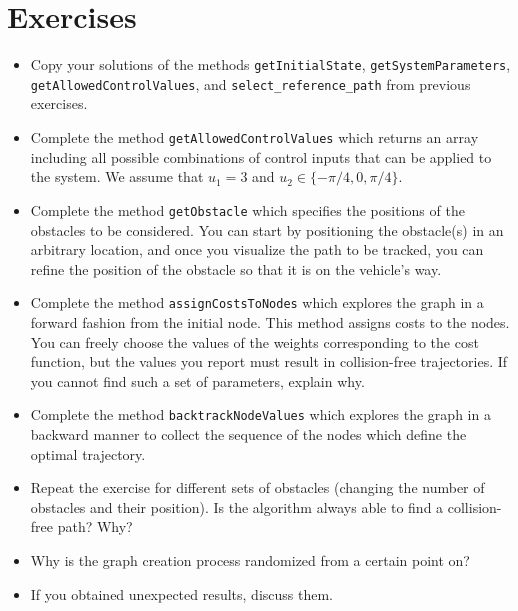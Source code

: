 \section{Exercises}
	\begin{itemize}
		\item Copy your solutions of the methods \texttt{getInitialState}, \texttt{getSystemParameters}, \newline \texttt{getAllowedControlValues}, and \texttt{select\_reference\_path} from previous exercises. 
		\item Complete the method \texttt{getAllowedControlValues} which returns an array including all possible combinations of control inputs that can be applied to the system. 
			We assume that $u_1 = 3$ and $u_2 \in \lbrace -\pi/4, 0, \pi/4 \rbrace$.
		\item Complete the method \texttt{getObstacle} which specifies the positions of the obstacles to be considered. You can start by positioning the obstacle(s) in an arbitrary location, and once you  visualize the path to be tracked, you can refine the position of the obstacle so that it is on the vehicle's way. 
		\item Complete the method \texttt{assignCostsToNodes} which explores the graph in a forward fashion from the initial node. This method assigns costs to the nodes. 
			You can freely choose the values of the weights corresponding to the cost function, but the values you report must result in collision-free trajectories. 
			If you cannot find such a set of parameters, explain why. 
		\item Complete the method \texttt{backtrackNodeValues} which explores the graph in a backward manner to collect the sequence of the nodes which define the optimal trajectory. 
		\item Repeat the exercise for different sets of obstacles (changing the number of obstacles and their position). 
		Is the algorithm always able to find a collision-free path? Why? 
		\item Why is the graph creation process randomized from a certain point on?
		\item If you obtained unexpected results, discuss them. 
	\end{itemize}
